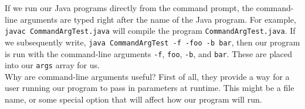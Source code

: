 If we run our Java programs directly from the command prompt, the command-line arguments are typed right after the name of the Java program. For example, \verb!javac CommandArgTest.java! will compile the program \verb!CommandArgTest.java!. If we subsequently write, \verb!java CommandArgTest -f -foo -b bar!, then our program is run with the command-line arguments \verb!-f!, \verb!foo!, \verb!-b!, and \verb!bar!. These are placed into our \verb!args! array for us. \\

Why are command-line arguments useful? First of all, they provide a way for a user running our program to pass in parameters at runtime. This might be a file name, or some special option that will affect how our program will run. 

